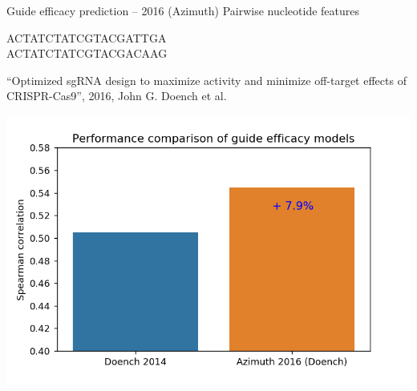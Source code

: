 \documentclass[Nike]{tuberlinbeamer}
\begin{document}
\begin{frame}{Guide efficacy prediction -- 2016 (Azimuth)}
  Pairwise nucleotide features

  \pause
  \huge ACTATCTATCGTACGA{\color{red}TT}GA \\
    \pause
  ACTATCTATCGTACGAC{\color{red}AA}G
    \begin{flushright}
      \tiny
      ``Optimized sgRNA design to maximize activity and minimize off-target effects of CRISPR-Cas9'', 2016, John G. Doench et al.\
    \end{flushright}
    \pause
  \center
  \includegraphics[width=0.5\linewidth]{./model_comparison1.png}
\end{frame}


\end{document}
